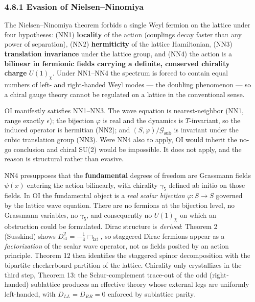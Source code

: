 \documentclass[
]{article}
\begin{document}
\hypertarget{evasion-of-nielsenninomiya}{%
\subsubsection{4.8.1 Evasion of
Nielsen--Ninomiya}\label{evasion-of-nielsenninomiya}}

The Nielsen--Ninomiya theorem forbids a single Weyl fermion on the
lattice under four hypotheses: (NN1) \textbf{locality} of the action
(couplings decay faster than any power of separation), (NN2)
\textbf{hermiticity} of the lattice Hamiltonian, (NN3)
\textbf{translation invariance} under the lattice group, and (NN4) the
action is a \textbf{bilinear in fermionic fields carrying a definite,
conserved chirality charge} \(U(1)_\chi\). Under NN1--NN4 the spectrum
is forced to contain equal numbers of left- and right-handed Weyl modes
--- the doubling phenomenon --- so a chiral gauge theory cannot be
regulated on a lattice in the conventional sense.

OI manifestly satisfies NN1--NN3. The wave equation is nearest-neighbor
(NN1, range exactly \(\epsilon\)); the bijection \(\varphi\) is real and
the dynamics is \(T\)-invariant, so the induced operator is hermitian
(NN2); and \((S,\varphi)/\mathcal{G}_{\text{sub}}\) is invariant under
the cubic translation group (NN3). Were NN4 also to apply, OI would
inherit the no-go conclusion and chiral SU(2) would be impossible. It
does not apply, and the reason is structural rather than evasive.

NN4 presupposes that the \textbf{fundamental} degrees of freedom are
Grassmann fields \(\psi(x)\) entering the action bilinearly, with
chirality \(\gamma_5\) defined ab initio on those fields. In OI the
fundamental object is a \emph{real scalar bijection}
\(\varphi: S \to S\) governed by the lattice wave equation. There are no
fermions at the bijection level, no Grassmann variables, no
\(\gamma_5\), and consequently no \(U(1)_\chi\) on which an obstruction
could be formulated. Dirac structure is \emph{derived}: Theorem 2
(Susskind) shows \(D_{\text{st}}^2 = -\tfrac14\Box_{\text{lat}}\), so
staggered Dirac fermions appear as a \emph{factorization} of the scalar
wave operator, not as fields posited by an action principle. Theorem 12
then identifies the staggered spinor decomposition with the bipartite
checkerboard partition of the lattice. Chirality only crystallizes in
the third step, Theorem 13: the Schur-complement trace-out of the odd
(right-handed) sublattice produces an effective theory whose external
legs are uniformly left-handed, with \(D_{LL}=D_{RR}=0\) enforced by
sublattice parity.
\end{document}
